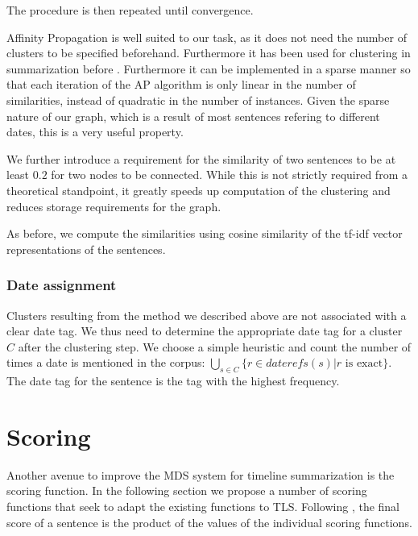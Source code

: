 \documentclass[a4paper,BCOR=10mm]{report}
\begin{document}
The procedure is then repeated until convergence.

Affinity Propagation is well suited to our task, as it does not need the number of clusters to be specified beforehand. Furthermore it has been used for clustering in summarization before \citep{salient-updates-disaster}. Furthermore it can be implemented in a sparse manner so that each iteration of the AP algorithm is only linear in the number of similarities, instead of quadratic in the number of instances. Given the sparse nature of our graph, which is a result of most sentences refering to different dates, this is a very useful property.

We further introduce a requirement for the similarity of two sentences to be at least $0.2$ for two nodes to be connected. While this is not strictly required from a theoretical standpoint, it greatly speeds up computation of the clustering and reduces storage requirements for the graph.

As before, we compute the similarities using cosine similarity of the tf-idf vector representations of the sentences.

\subsubsection{Date assignment}

Clusters resulting from the method we described above are not associated with a clear date tag. We thus need to determine the appropriate date tag for a cluster $C$ after the clustering step. We choose a simple heuristic and count the number of times a date is mentioned in the corpus: $\bigcup_{s \in C} \{r \in daterefs(s) | r \text{ is exact}\}$. The date tag for the sentence is the tag with the highest frequency.



\section{Scoring} \label{sec:scoring}

Another avenue to improve the MDS system for timeline summarization is the scoring function.
In the following section we propose a number of scoring functions that seek to adapt the existing functions to TLS.
Following \citet{banerjee}, the final score of a sentence is the product of the values of the individual scoring functions.
\end{document}
